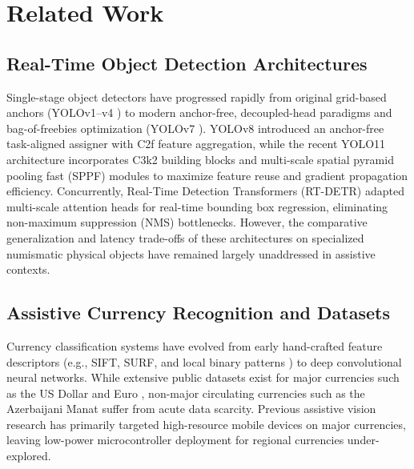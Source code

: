 \documentclass[conference]{IEEEtran}
\begin{document}
\section{Related Work}
\label{sec:related}

\subsection{Real-Time Object Detection Architectures}
Single-stage object detectors have progressed rapidly from original grid-based anchors (YOLOv1--v4 \cite{redmon2016you,bochkovskiy2020yolov4}) to modern anchor-free, decoupled-head paradigms and bag-of-freebies optimization (YOLOv7 \cite{wang2023yolov7}). YOLOv8 \cite{jocher2023yolo} introduced an anchor-free task-aligned assigner with C2f feature aggregation, while the recent YOLO11 architecture incorporates C3k2 building blocks and multi-scale spatial pyramid pooling fast (SPPF) modules to maximize feature reuse and gradient propagation efficiency. Concurrently, Real-Time Detection Transformers (RT-DETR) \cite{lv2024detrs} adapted multi-scale attention heads for real-time bounding box regression, eliminating non-maximum suppression (NMS) bottlenecks. However, the comparative generalization and latency trade-offs of these architectures on specialized numismatic physical objects have remained largely unaddressed in assistive contexts.

\subsection{Assistive Currency Recognition and Datasets}
Currency classification systems have evolved from early hand-crafted feature descriptors (e.g., SIFT, SURF, and local binary patterns \cite{lowe2004distinctive,ojala2002multiresolution}) to deep convolutional neural networks. While extensive public datasets exist for major currencies such as the US Dollar and Euro \cite{pham2020deep,solymar2011banknote,dunai2017euro}, non-major circulating currencies such as the Azerbaijani Manat suffer from acute data scarcity. Previous assistive vision research has primarily targeted high-resource mobile devices on major currencies, leaving low-power microcontroller deployment for regional currencies under-explored.
\end{document}
